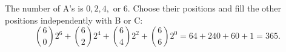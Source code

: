 The number of A's is $0,2,4,$ or $6$. Choose their positions and fill the other positions independently with B or C:
\[\binom602^6+\binom622^4+\binom642^2+\binom662^0=64+240+60+1=\boxed{365}.\]

